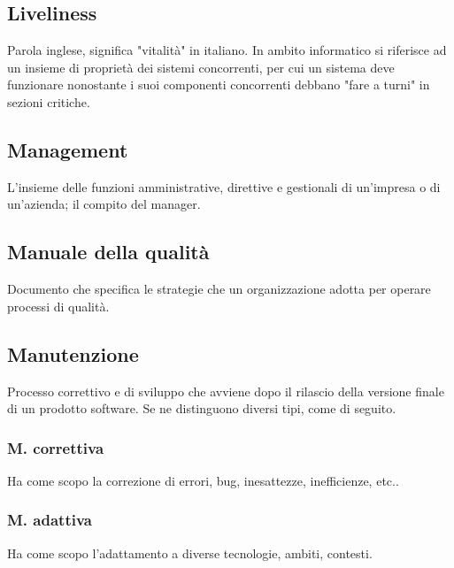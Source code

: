 	\subsection{Liveliness}
	\label{sec:liveliness}
	Parola inglese, significa "vitalità" in italiano. In ambito informatico si riferisce ad un insieme di proprietà dei sistemi concorrenti, per cui un sistema deve funzionare nonostante i suoi componenti concorrenti debbano "fare a turni" in sezioni critiche.



	\subsection{Management}
	\label{sec:management}
	L'insieme delle funzioni amministrative, direttive e gestionali di un'impresa o di un'azienda; il compito del manager.

	\subsection{Manuale della qualità}
	\label{sec:manualequalita}
	Documento che specifica le strategie che un organizzazione adotta per operare processi di qualità.

	\subsection{Manutenzione}
	\label{sec:manutenzione}
	Processo correttivo e di sviluppo che avviene dopo il rilascio della versione finale di un prodotto software. Se ne distinguono diversi tipi, come di seguito.

		\subsubsection{M. correttiva}
		Ha come scopo la correzione di errori, bug, inesattezze, inefficienze, etc..

		\subsubsection{M. adattiva}
		Ha come scopo l'adattamento a diverse tecnologie, ambiti, contesti.

